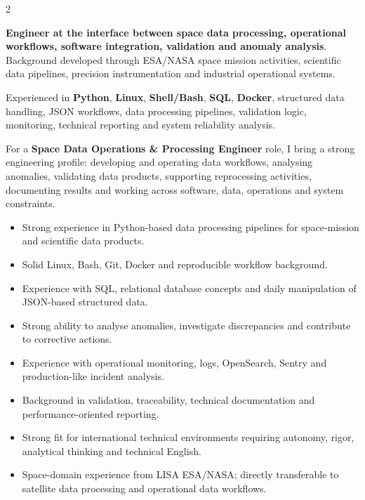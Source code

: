 \documentclass[8pt,a4paper,ragged2e,withhyper]{altacv}
\begin{document}
\begin{paracol}{2}
\switchcolumn


\textbf{Engineer at the interface between space data processing, operational workflows, software integration, validation and anomaly analysis}. Background developed through ESA/NASA space mission activities, scientific data pipelines, precision instrumentation and industrial operational systems.

Experienced in \textbf{Python}, \textbf{Linux}, \textbf{Shell/Bash}, \textbf{SQL}, \textbf{Docker}, structured data handling, JSON workflows, data processing pipelines, validation logic, monitoring, technical reporting and system reliability analysis.

For a \textbf{Space Data Operations \& Processing Engineer} role, I bring a strong engineering profile: developing and operating data workflows, analysing anomalies, validating data products, supporting reprocessing activities, documenting results and working across software, data, operations and system constraints.


\begin{itemize}
  \item Strong experience in Python-based data processing pipelines for space-mission and scientific data products.
  \item Solid Linux, Bash, Git, Docker and reproducible workflow background.
  \item Experience with SQL, relational database concepts and daily manipulation of JSON-based structured data.
  \item Strong ability to analyse anomalies, investigate discrepancies and contribute to corrective actions.
  \item Experience with operational monitoring, logs, OpenSearch, Sentry and production-like incident analysis.
  \item Background in validation, traceability, technical documentation and performance-oriented reporting.
  \item Strong fit for international technical environments requiring autonomy, rigor, analytical thinking and technical English.
  \item Space-domain experience from LISA ESA/NASA; directly transferable to satellite data processing and operational data workflows.
\end{itemize}



\end{paracol}
\end{document}
